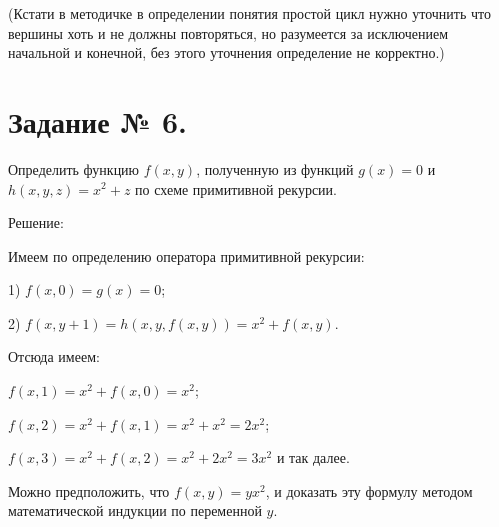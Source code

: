 \documentclass[fleqn]{article}
\begin{document}
(Кстати в методичке в определении понятия простой цикл нужно уточнить что вершины хоть и не должны повторяться, но разумеется за исключением начальной и конечной, без этого уточнения определение не корректно.)

\section*{Задание № 6.}

Определить функцию $f(x,y)$, полученную из функций $g(x)=0$ и
$h(x, y, z) = x^2+z$ по схеме примитивной рекурсии.

\begin{center}Решение:\end{center}

Имеем по определению оператора примитивной рекурсии:

1) $f(x,0)=g(x)=0$;

2) $f(x,y+1)=h\left(x,y,f(x,y)\right)=x^2+f(x,y)$.

Отсюда имеем:

$f(x,1)=x^2+f(x,0)=x^2$;

$f(x,2)=x^2+f(x,1)=x^2+x^2=2x^2$;

$f(x,3)=x^2+f(x,2)=x^2+2x^2=3x^2$ и так далее.

Можно предположить, что $f(x,y)=yx^2$, и доказать эту формулу
методом математической индукции по переменной $y$.
\end{document}
